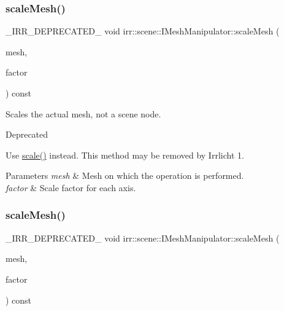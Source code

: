 \subsubsection{\texorpdfstring{scale\+Mesh()}{scaleMesh()}\hspace{0.1cm}{\footnotesize\ttfamily [1/2]}}
{\footnotesize\ttfamily \+\_\+\+I\+R\+R\+\_\+\+D\+E\+P\+R\+E\+C\+A\+T\+E\+D\+\_\+ void irr\+::scene\+::\+I\+Mesh\+Manipulator\+::scale\+Mesh (\begin{DoxyParamCaption}\item[{\hyperlink{classirr_1_1scene_1_1IMesh}{I\+Mesh} $\ast$}]{mesh,  }\item[{const \hyperlink{namespaceirr_1_1core_ae6e2b2a6c552833ebbd5b7463d03586b}{core\+::vector3df} \&}]{factor }\end{DoxyParamCaption}) const\hspace{0.3cm}{\ttfamily [inline]}}



Scales the actual mesh, not a scene node. 

\begin{DoxyRefDesc}{Deprecated}
\item[\hyperlink{deprecated__deprecated000040}{Deprecated}]Use \hyperlink{classirr_1_1scene_1_1IMeshManipulator_abd2a0bdd00605f638f619177e64b1cce}{scale()} instead. This method may be removed by Irrlicht 1. \end{DoxyRefDesc}

\begin{DoxyParams}{Parameters}
{\em mesh} & Mesh on which the operation is performed. \\
\hline
{\em factor} & Scale factor for each axis. \\
\hline
\end{DoxyParams}
\mbox{\label{classirr_1_1scene_1_1IMeshManipulator_a00f8ef80adfd5bb15644b64e8cd9f55e}} 
\subsubsection{\texorpdfstring{scale\+Mesh()}{scaleMesh()}\hspace{0.1cm}{\footnotesize\ttfamily [2/2]}}
{\footnotesize\ttfamily \+\_\+\+I\+R\+R\+\_\+\+D\+E\+P\+R\+E\+C\+A\+T\+E\+D\+\_\+ void irr\+::scene\+::\+I\+Mesh\+Manipulator\+::scale\+Mesh (\begin{DoxyParamCaption}\item[{\hyperlink{classirr_1_1scene_1_1IMesh}{I\+Mesh} $\ast$}]{mesh,  }\item[{const \hyperlink{namespaceirr_1_1core_ae6e2b2a6c552833ebbd5b7463d03586b}{core\+::vector3df} \&}]{factor }\end{DoxyParamCaption}) const\hspace{0.3cm}{\ttfamily [inline]}}



